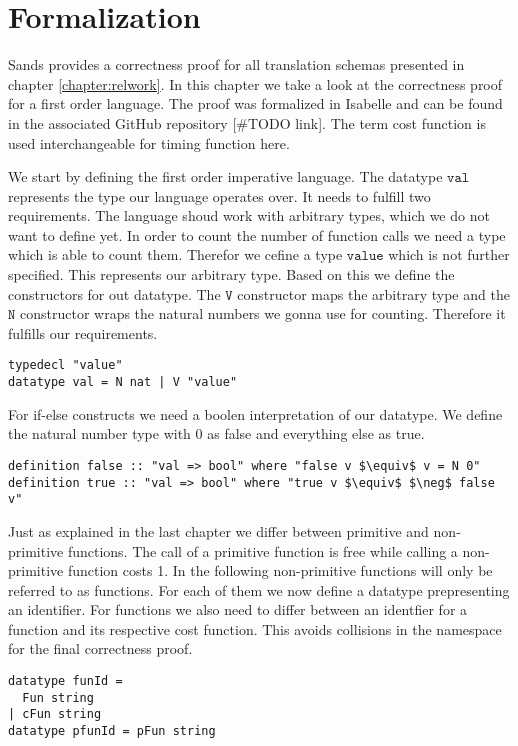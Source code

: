 
\chapter{Formalization}\label{chapter:formal}

Sands provides a correctness proof for all translation schemas presented in chapter \ref{chapter:relwork}.
In this chapter we take a look at the correctness proof for a first order language.
The proof was formalized in Isabelle and can be found in the associated GitHub repository [\#TODO link].
The term cost function is used interchangeable for timing function here.

We start by defining the first order imperative language.
The datatype $\texttt{val}$ represents the type our language operates over.
It needs to fulfill two requirements.
The language shoud work with arbitrary types, which we do not want to define yet.
In order to count the number of function calls we need a type which is able to count them.
Therefor we cefine a type $\texttt{value}$ which is not further specified.
This represents our arbitrary type.
Based on this we define the constructors for out datatype.
The $\texttt{V}$ constructor maps the arbitrary type and the $\texttt{N}$ constructor wraps the natural numbers we gonna use for counting.
Therefore it fulfills our requirements.
\begin{lstlisting}[language=isabelle]
typedecl "value"
datatype val = N nat | V "value"
\end{lstlisting}

For if-else constructs we need a boolen interpretation of our datatype.
We define the natural number type with 0 as false and everything else as true.
\begin{lstlisting}[mathescape=true,language=isabelle]
definition false :: "val => bool" where "false v $\equiv$ v = N 0"
definition true :: "val => bool" where "true v $\equiv$ $\neg$ false v"
\end{lstlisting}

Just as explained in the last chapter we differ between primitive and non-primitive functions.
The call of a primitive function is free while calling a non-primitive function costs 1.
In the following non-primitive functions will only be referred to as functions.
For each of them we now define a datatype prepresenting an identifier.
For functions we also need to differ between an identfier for a function and its respective cost function.
This avoids collisions in the namespace for the final correctness proof.
\begin{lstlisting}[language=isabelle]
datatype funId =
  Fun string
| cFun string
datatype pfunId = pFun string
\end{lstlisting}

